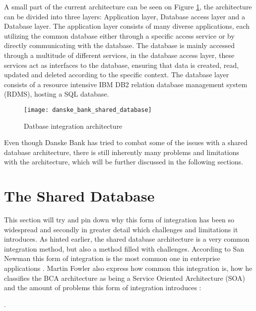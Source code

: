 A small part of the current architecture can be seen on Figure \ref{fig:danske_bank_shared_database}, the architecture can be divided into three layers: Application layer, Database access layer and a Database layer. The application layer consists of many diverse applications, each utilizing the common database either through a specific access service or by directly communicating with the database. The database is mainly accessed through a multitude of different services, in the database access layer, these services act as interfaces to the database, ensuring that data is created, read, updated and deleted according to the specific context. The database layer consists of a resource intensive IBM DB2 relation database management system (RDMS), hosting a SQL database. 


\begin{figure}[!htb]
  \texttt{[image: danske\_bank\_shared\_database]}  
  \caption{Datbase integration architecture}
  \label{fig:danske_bank_shared_database}
\end{figure}


Even though Danske Bank has tried to combat some of the issues with a shared database architecture, there is still inherently many problems and limitations with the architecture, which will be further discussed in the following sections.

\section{The Shared Database}
This section will try and pin down why this form of integration has been so widespread and secondly in greater detail which challenges and limitations it introduces. As hinted earlier, the shared database architecture is a very common integration method, but also a method filled with challenges. According to San Newman this form of integration is the most common one in enterprise applications \cite[p.~41]{newman2015microservices}. Martin Fowler also express how common this integration is, how he classifies the BCA architecture as being a Service Oriented Architecture (SOA) and the amount of problems this form of integration introduces \cite{fowler2014microservicesoamonolith}:

. 

